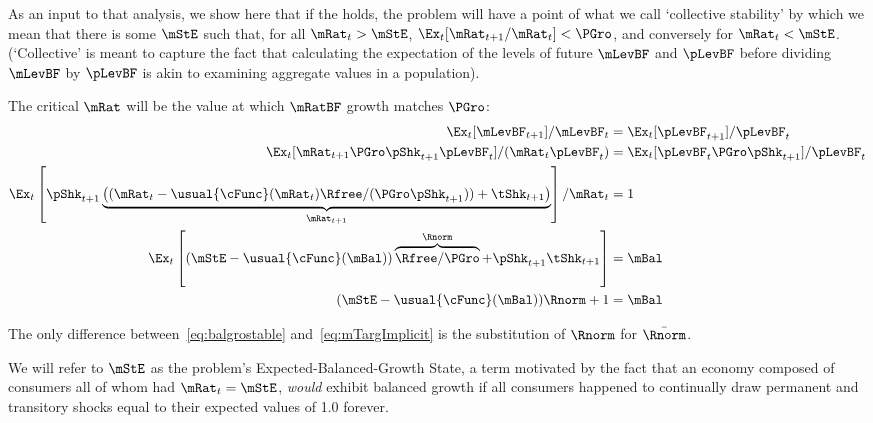 \documentclass[BufferStockTheory]{subfiles}
\begin{document}
As an input to that analysis, we show here that if the {\GIC} holds, the problem will have a point of what we call `collective stability' by which we mean that there is some ${\mStE}$ such that, for all $\mRat_{t}>{\mStE}$, $\Ex_{t}[\mRat_{t+1}/\mRat_{t}] < \PGro$, and conversely for $\mRat_{t}<{\mStE}$.  (`Collective' is meant to capture the fact that calculating the expectation of the levels of future $\mLevBF$ and $\pLevBF$ before dividing $\mLevBF$ by $\pLevBF$ is akin to examining aggregate values in a population).

 \hypertarget{balgrostable}{}
\hypertarget{balgrostableSolve}{}

 The critical $\mRat$ will be the value at which $\mRatBF$ growth matches $\PGro$:
  \begin{align}
  \Ex_{t}[\mLevBF_{t+1}]/\mLevBF_{t} & =\Ex_{t}[\pLevBF_{t+1}]/\pLevBF_{t} \notag
    \\  \Ex_{t}[\mRat_{t+1}\PGro\pShk_{t+1}\pLevBF_{t}]/(\mRat_{t}\pLevBF_{t}) & =\Ex_{t}[\pLevBF_{t}\PGro\pShk_{t+1}]/\pLevBF_{t} \notag
    \\ \Ex_{t}\left[\pShk_{t+1}\underbrace{\left((\mRat_{t}-\usual{\cFunc}(\mRat_{t})\Rfree/(\PGro\pShk_{t+1}))+\tShk_{t+1}\right)}_{\mRat_{t+1}}\right]/\mRat_{t} & = 1 \notag
    \\
    \Ex_{t}\left[(\mStE-\usual{\cFunc}(\mBal))\overbrace{\Rfree/\PGro}^{\Rnorm}+\pShk_{t+1}\tShk_{t+1}\right] & = \mBal \notag
\\  (\mStE-\usual{\cFunc}(\mBal))\Rnorm+ 1 & = \mBal \label{eq:balgrostable}
\end{align}

The only difference between~\eqref{eq:balgrostable} and~\eqref{eq:mTargImplicit} is the substitution of $\Rnorm$ for $\bar{\Rnorm}$.

  We will refer to $\mStE$ as the problem's Expected-Balanced-Growth State, a term motivated by the fact that an economy composed of consumers all of whom had $\mRat_{t}=\mStE$, \textit{would} exhibit balanced growth if all consumers happened to continually draw permanent and transitory shocks equal to their expected values of 1.0 forever.%
\end{document}
